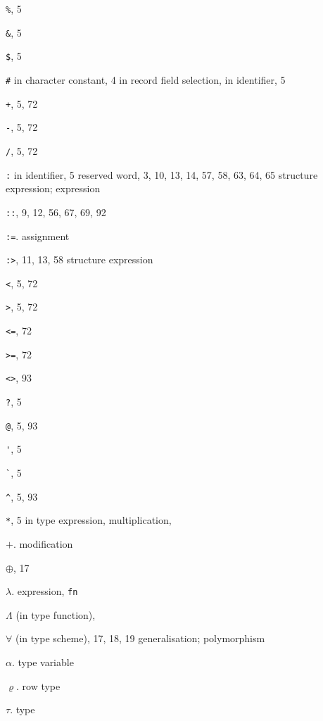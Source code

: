 \begin{theindex}
\item \verb+%+, 5
\item \verb+&+, 5
\item \verb+$+, 5
\item \verb+#+
\subitem in character constant, 4
\subitem in record field selection, \hashrefs
\subitem in identifier, 5
\item \verb(+(, 5, 72
\item \verb+-+, 5, 72
\item \verb+/+, 5, 72
\item \verb+:+
\subitem in identifier, 5
\subitem reserved word, 3, 10, 13, 14, 57, 58, 63, 64, 65
\subitem \seealso structure expression; expression
\item \verb+::+, 9, 12, 56, 67, 69, 92
\item \verb+:=+. \see assignment
\item \verb+:>+, 11, 13, 58
\subitem \seealso structure expression
\item \verb+<+, 5, 72
\item \verb+>+, 5, 72
\item \verb+<=+, 72
\item \verb+>=+, 72
\item \verb+<>+, 93
\item \verb+?+, 5
\item \verb+@+, 5, 93
\item \verb+'+, 5
\item \verb+`+, 5
\item \verb+^+, 5, 93
\item \verb+*+, 5
\subitem in type expression, \startyperefs
\subitem multiplication, \mulrefs
\item $+$. \see modification
\item $\oplus$, 17
\item $\lambda$. \see expression, {\tt fn}
\item $\Lambda$ (in type function), \Lambdarefs
\item $\forall$ (in type scheme), 17, 18, 19
\subitem \seealso generalisation; polymorphism
\item $\alpha$. \see type variable
\item $\varrho$. \see row type

\item $\tau$. \see type


\end{theindex}
